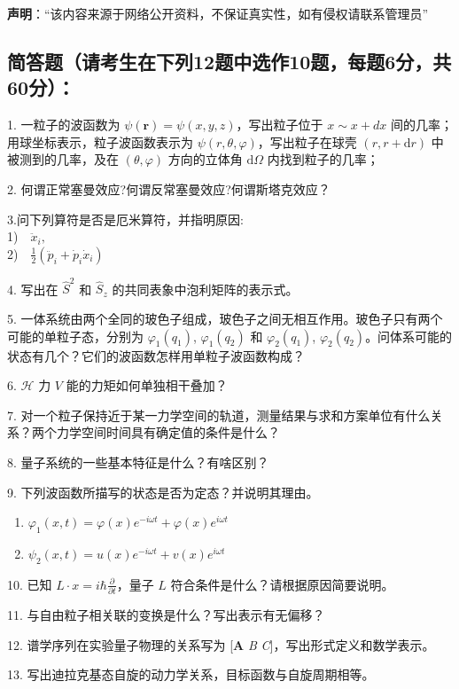 
\textbf{声明}：“该内容来源于网络公开资料，不保证真实性，如有侵权请联系管理员”

\subsection{简答题（请考生在下列12题中选作10题，每题6分，共60分）：}

1. 一粒子的波函数为 $\psi (\mathbf{r}) = \psi (x, y, z)$，写出粒子位于 $x \sim x + d x$ 间的几率；用球坐标表示，粒子波函数表示为 $\psi (r, \theta, \varphi)$，写出粒子在球壳 $(r, r + \mathrm{d}r)$ 中被测到的几率，及在 $(\theta, \varphi)$ 方向的立体角 $\mathrm{d}\Omega$ 内找到粒子的几率；

2. 何谓正常塞曼效应?何谓反常塞曼效应?何谓斯塔克效应？

3.问下列算符是否是厄米算符，并指明原因:\\
1)$\quad \ddot{x}_i,$\\ 2)$\quad \frac{1}{2}(\ddot{p}_i + \dot{p}_i \dot{x}_i)$

4. 写出在 $\hat{S}^2$ 和 $\hat{S}_z$ 的共同表象中泡利矩阵的表示式。

5. 一体系统由两个全同的玻色子组成，玻色子之间无相互作用。玻色子只有两个可能的单粒子态，分别为 $\varphi_1(q_1)$, $\varphi_1(q_2)$ 和 $\varphi_2(q_1)$, $\varphi_2(q_2)$。问体系可能的状态有几个？它们的波函数怎样用单粒子波函数构成？


6. $\mathcal{H}$ 力 $V$ 能的力矩如何单独相干叠加？

7. 对一个粒子保持近于某一力学空间的轨道，测量结果与求和方案单位有什么关系？两个力学空间时间具有确定值的条件是什么？

8. 量子系统的一些基本特征是什么？有啥区别？

9. 下列波函数所描写的状态是否为定态？并说明其理由。

\begin{enumerate}
  \item $\varphi_1 (x, t) = \varphi (x) e^{-i \omega t} + \varphi (x) e^{i \omega t}$
  \item $\psi_2 (x, t) = u (x) e^{-i \omega t} + v (x) e^{i \omega t}$
\end{enumerate}

10. 已知 $L \cdot x = i \hbar \frac{\partial}{\partial t}$，量子 $L$ 符合条件是什么？请根据原因简要说明。

11. 与自由粒子相关联的变换是什么？写出表示有无偏移？

12. 谱学序列在实验量子物理的关系写为 [\textbf{A} \textit{B} \textit{C}]，写出形式定义和数学表示。

13. 写出迪拉克基态自旋的动力学关系，目标函数与自旋周期相等。
